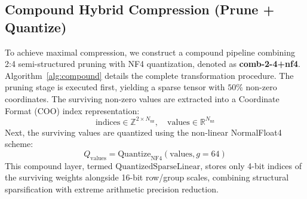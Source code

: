 \documentclass[conference]{IEEEtran}
\begin{document}
\subsection{Compound Hybrid Compression (Prune + Quantize)}
To achieve maximal compression, we construct a compound pipeline combining 2:4 semi-structured pruning with NF4 quantization, denoted as \textbf{comb-2-4+nf4}. Algorithm~\ref{alg:compound} details the complete transformation procedure. The pruning stage is executed first, yielding a sparse tensor with $50\%$ non-zero coordinates. The surviving non-zero values are extracted into a Coordinate Format (COO) index representation:
\begin{equation}
\text{indices} \in \mathbb{Z}^{2 \times N_{\text{nz}}}, \quad \text{values} \in \mathbb{R}^{N_{\text{nz}}}
\end{equation}
Next, the surviving values are quantized using the non-linear NormalFloat4 scheme:
\begin{equation}
Q_{\text{values}} = \text{Quantize}_{\text{NF4}}(\text{values}, g=64)
\end{equation}
This compound layer, termed $\text{QuantizedSparseLinear}$, stores only 4-bit indices of the surviving weights alongside 16-bit row/group scales, combining structural sparsification with extreme arithmetic precision reduction.
\end{document}
